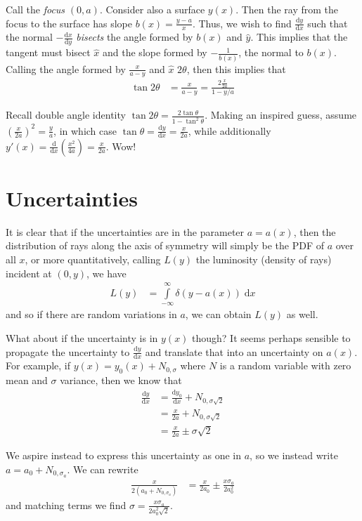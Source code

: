 \documentclass[12pt]{report}
\newcommand*{\rd}[2]{\frac{\mathrm{d}#1}{\mathrm{d}#2}}
\begin{document}
Call the \emph{focus} $(0, a)$. Consider also a surface $y(x)$. Then the ray
from the focus to the surface has slope $b(x) = \frac{y - a}{x}$. Thus, we wish
to find $\rd{y}{x}$ such that the normal $-\rd{x}{y}$ \emph{bisects} the angle
formed by $b(x)$ and $\hat{y}$. This implies that the tangent must bisect
$\hat{x}$ and the slope formed by $-\frac{1}{b(x)}$, the normal to $b(x)$.
Calling the angle formed by $\frac{x}{a - y}$ and $\hat{x}$ $2\theta$, then this
implies that
\begin{align*}
    \tan 2\theta &= \frac{x}{a - y} = \frac{2\frac{x}{2a}}{1 - y/a}
\end{align*}

Recall double angle identity $\tan 2\theta = \frac{2\tan \theta}{1 -
\tan^2\theta}$. Making an inspired guess, assume $\left( \frac{x}{2a}
\right)^2 = \frac{y}{a}$, in which case $\tan\theta = \rd{y}{x} = \frac{x}{2a}$,
while additionally $y'(x) = \rd{}{x}\left( \frac{x^2}{4a} \right) =
\frac{x}{2a}$. Wow!

\section{Uncertainties}

It is clear that if the uncertainties are in the parameter $a = a(x)$, then the
distribution of rays along the axis of symmetry will simply be the PDF of $a$
over all $x$, or more quantitatively, calling $L(y)$ the luminosity (density of
rays) incident at $(0, y)$, we have
\begin{align*}
    L(y) &= \int\limits_{-\infty}^{\infty}\delta(y - a(x))\;\mathrm{d}x
\end{align*}
and so if there are random variations in $a$, we can obtain $L(y)$ as well.

What about if the uncertainty is in $y(x)$ though? It seems perhaps sensible to
propagate the uncertainty to $\rd{y}{x}$ and translate that into an uncertainty
on $a(x)$. For example, if $y(x) = y_0(x) + N_{0, \sigma}$ where $N$ is a random
variable with zero mean and $\sigma$ variance, then we know that
\begin{align*}
    \rd{y}{x}
        &= \rd{y_0}{x} + N_{0, \sigma\sqrt{2}}\\
        &= \frac{x}{2a} + N_{0, \sigma\sqrt{2}}\\
        &= \frac{x}{2a} \pm \sigma \sqrt{2}
\end{align*}

We aspire instead to express this uncertainty as one in $a$, so we instead write
$a = a_0 + N_{0, \sigma_a}$. We can rewrite
\begin{align*}
    \frac{x}{2(a_0 + N_{0, \sigma_a})}
        &= \frac{x}{2a_0} \pm \frac{x \sigma_a}{2 a_0^2}
\end{align*}
and matching terms we find $\sigma = \frac{x\sigma_a}{2a_0^2 \sqrt{2}}$.
\end{document}
